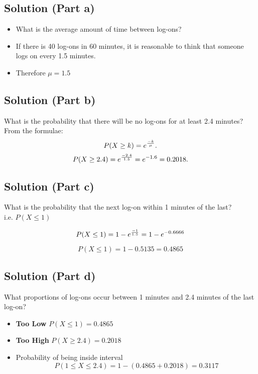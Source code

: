 \documentclass[a4paper,12pt]{article}
\begin{document}
\subsection*{Solution (Part a) }

\large
\begin{itemize} \item What is the average amount of time between log-ons?

\item If there is 40 log-ons in 60 minutes, it is reasonable to think that someone logs on every 1.5 minutes.
\item Therefore $\mu = 1.5$
\end{itemize}


\subsection*{Solution (Part b) }
\large

What is the probability that there will be no log-ons for at least 2.4 minutes?\\
\bigskip
From the formulae:
\[
P( X \geq k) = e^{{-k \over \mu}} .
\]
\medskip
\[
P( X \geq 2.4) = e^{{-2.4 \over 1.5}} = e^{-1.6} = 0.2018.
\]

\medskip 
\subsection*{Solution (Part c) }
\large

What is the probability that the next log-on within 1 minutes of the last?\\
i.e. $P(X \leq 1)$
\bigskip

\[
P( X \leq 1) = 1 - e^{{-1 \over 1.5}} = 1 -  e^{-0.6666}
\]

\[
P( X \leq 1) = 1 -  0.5135  = 0.4865
\]
\medskip 
\subsection*{Solution (Part d) }
\large

What proportions of log-ons occur between 1 minutes and 2.4 minutes of the last log-on?\\
\bigskip
\begin{itemize}
\item \textbf{Too Low} $P(X \leq 1) = 0.4865$\\
\item \textbf{Too High} $P(X \geq 2.4) = 0.2018$\\
\item Probability of being inside interval %
\[P(1 \leq X \leq 2.4) = 1- ( 0.4865 + 0.2018) = 0.3117\]
\end{itemize}
\end{document}
